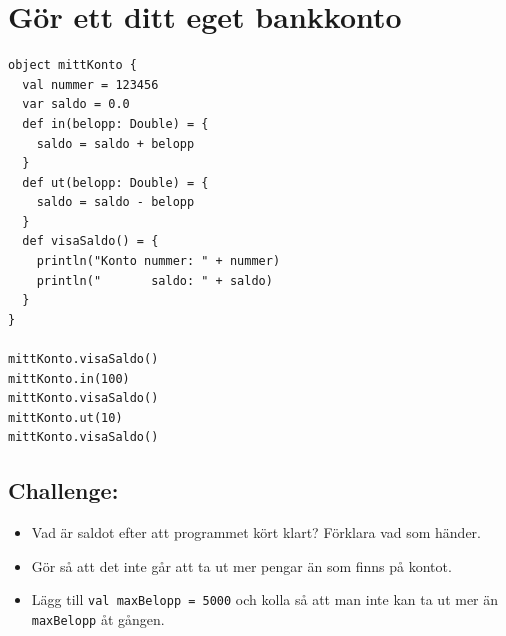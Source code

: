 \chapter{Gör ett ditt eget bankkonto}
\begin{multicols}{2}

\begin{lstlisting}[basicstyle={\ttfamily\fontsize{16}{19}\selectfont},numbers=none]
object mittKonto {
  val nummer = 123456
  var saldo = 0.0
  def in(belopp: Double) = {
    saldo = saldo + belopp 
  }
  def ut(belopp: Double) = { 
    saldo = saldo - belopp 
  }
  def visaSaldo() = {
    println("Konto nummer: " + nummer) 
    println("       saldo: " + saldo)
  }
}

mittKonto.visaSaldo()
mittKonto.in(100)
mittKonto.visaSaldo()
mittKonto.ut(10)
mittKonto.visaSaldo()
\end{lstlisting}
        


\columnbreak


\section*{\color{BrickRed}Challenge:}


\begin{itemize}

\item {Vad är saldot efter att programmet kört klart? Förklara vad som händer.}
\item {Gör så att det inte går att ta ut mer pengar än som finns på kontot.}
\item {Lägg till \lstinline{val maxBelopp = 5000} och kolla så att man inte kan ta ut mer än \lstinline{maxBelopp} åt gången.}

\end{itemize}


\end{multicols}

